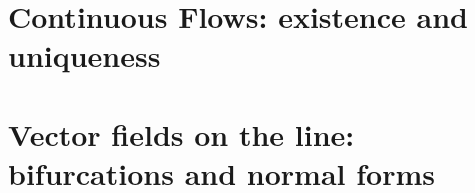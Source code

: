 \documentclass[fleqn]{mc}
\begin{document}
\tableofcontents

\section{Continuous Flows: existence and uniqueness}


\section{Vector fields on the line: bifurcations and normal forms}



\end{document}
